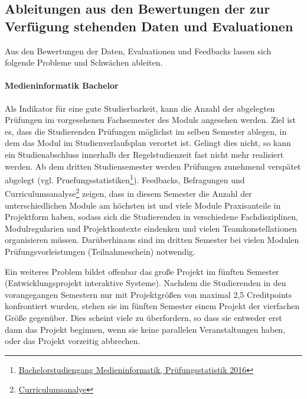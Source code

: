\subsection{Ableitungen aus den Bewertungen der zur Verfügung
stehenden Daten und
Evaluationen\label{/mi-2017/selbstbericht/0100-ist-zustand/0100-ist-zustand}}\label{ableitungen-aus-den-bewertungen-der-zur-verfuxfcgung-stehenden-daten-und-evaluationenpathlabelmi-2017selbstbericht0100-ist-zustand0100-ist-zustand}

Aus den Bewertungen der Daten, Evaluationen und Feedbacks lassen sich
folgende Probleme und Schwächen ableiten.

\paragraph{Medieninformatik
Bachelor\label{/mi-2017/selbstbericht/0100-ist-zustand/0100-ist-zustand}}\label{medieninformatik-bachelorpathlabelmi-2017selbstbericht0100-ist-zustand0100-ist-zustand}

Als Indikator für eine gute Studierbarkeit, kann die Anzahl der
abgelegten Prüfungen im vorgesehenen Fachsemester des Moduls angesehen
werden. Ziel ist es, dass die Studierenden Prüfungen möglichst im selben
Semester ablegen, in dem das Modul im Studienverlaufsplan verortet ist.
Gelingt dies nicht, so kann ein Studienabschluss innerhalb der
Regelstudienzeit fast nicht mehr realisiert werden. Ab dem dritten
Studiensemester werden Prüfungen zunehmend verspätet abgelegt (vgl.
Pruefungsstatistiken\footnote{\href{https://th-koeln.github.io/mi-2017/anhaenge/ba-pruefungsstatistiken.pdf}{Bachelorstudiengang
  Medieninformatik, Prüfungsstatistik 2016}}). Feedbacks, Befragungen
und Curriculumsanalyse\footnote{\href{https://th-koeln.github.io/mi-2017/anhaenge/ba-pruefungsstatistiken.pdf}{Curriculumsanalye}}
zeigen, dass in diesem Semester die Anzahl der unterschiedlichen Module
am höchsten ist und viele Module Praxisanteile in Projektform haben,
sodass sich die Studierenden in verschiedene Fachdisziplinen,
Modulregularien und Projektkontexte eindenken und vielen
Teamkonstellationen organisieren müssen. Darüberhinaus sind im dritten
Semester bei vielen Modulen Prüfungsvorleistungen (Teilnahmeschein)
notwendig.

Ein weiteres Problem bildet offenbar das große Projekt im fünften
Semester (Entwicklungsprojekt interaktive Systeme). Nachdem die
Studierenden in den vorangegangen Semestern nur mit Projektgrößen von
maximal 2,5 Creditpoints konfrontiert wurden, stehen sie im fünften
Semester einem Projekt der vierfachen Größe gegenüber. Dies scheint
viele zu überfordern, so dass sie entweder erst dann das Projekt
beginnen, wenn sie keine parallelen Veranstaltungen haben, oder das
Projekt vorzeitig abbrechen.

